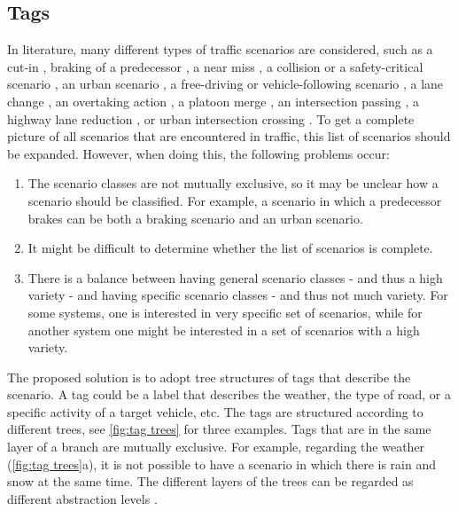 \cbstart

\subsection{Tags}
\label{sec:tags}

In literature, many different types of traffic scenarios are considered, such as a cut-in \cite{xu2002effects, gietelink2006development,roesener2017comprehensive}, braking of a predecessor \cite{xu2002effects,deGelder2017assessment,hulshof2013autonomous}, a near miss \cite{gietelink2006development}, a collision or a safety-critical scenario \cite{gietelink2006development,ebner2011identifying}, an urban scenario \cite{zofka2015datadrivetrafficscenarios}, a free-driving or vehicle-following scenario \cite{roesener2017comprehensive}, a lane change \cite{roesener2017comprehensive}, an overtaking action \cite{karaduman2013interactivebehavior}, a platoon merge \cite{englund2016grand}, an intersection passing \cite{englund2016grand}, a highway lane reduction \cite{ploeg2017GCDC}, or urban intersection crossing \cite{ploeg2017GCDC}. To get a complete picture of all scenarios that are encountered in traffic, this list of scenarios should be expanded. However, when doing this, the following problems occur:

\begin{enumerate}
	\item The scenario classes are not mutually exclusive, so it may be unclear how a scenario should be classified. For example, a scenario in which a predecessor brakes can be both a braking scenario and an urban scenario.
	\item It might be difficult to determine whether the list of scenarios is complete.
	\item There is a balance between having general scenario classes - and thus a high variety - and having specific scenario classes - and thus not much variety. For some systems, one is interested in very specific set of scenarios, while for another system one might be interested in a set of scenarios with a high variety.
\end{enumerate}

The proposed solution is to adopt tree structures of tags that describe the scenario. A tag could be a label that describes the weather, the type of road, or a specific activity of a target vehicle, etc. The tags are structured according to different trees, see \cref{fig:tag trees} for three examples. Tags that are in the same layer of a branch are mutually exclusive. For example, regarding the weather (\cref{fig:tag trees}a), it is not possible to have a scenario in which there is rain and snow at the same time. The different layers of the trees can be regarded as different abstraction levels \cite{Bonnin2014}. 


